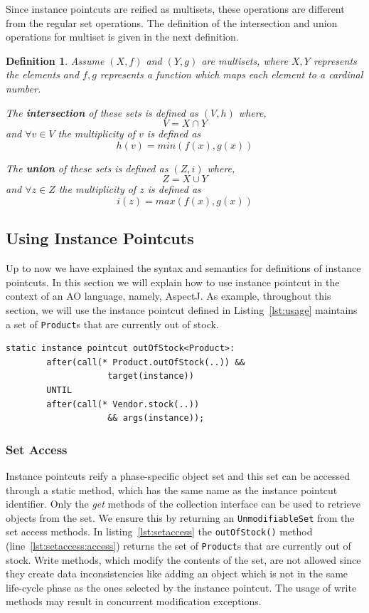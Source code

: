 \documentclass{acm_proc_article-sp}
\newtheorem{mydef}{Definition}
\newcommand{\lstinln}[1]{\lstinline~#1~}
\begin{document}
Since instance pointcuts are reified as multisets, these operations are different from the regular set operations. The definition of the intersection and union operations for multiset is given in the next definition.

\begin{mydef}
\label{def:inun}
Assume $(X, f)$ and $(Y, g)$ are multisets, where $X, Y$ represents the elements and $f, g$ represents a function which maps each element to a cardinal number. 

The \textbf{intersection} of these sets is defined as $(V, h)$ where, 
\[V = X \cap Y\] and
$\forall v \in V$ the multiplicity of $v$ is defined as \[h(v) =  min(f(x),g(x))\]

The \textbf{union} of these sets is defined as $(Z, i)$ where, 
\[Z = X \cup Y\] and
$\forall z \in Z$ the multiplicity of $z$ is defined as \[i(z) =  max(f(x),g(x))\]
\end{mydef}

\subsection{Using Instance Pointcuts}
Up to now we have explained the syntax and semantics for definitions of instance pointcuts. In this section we will explain how to use instance pointcut in the context of an AO language, namely, AspectJ. As example, throughout this section, we will use the instance pointcut defined in Listing~\ref{lst:usage} maintains a set of \lstinln{Product}s that are currently out of stock.

\begin{lstlisting}[float=h!, caption={An instance pointcut for out of stock products}, label={lst:usage}]
	static instance pointcut outOfStock<Product>: 
		after(call(* Product.outOfStock(..)) && 
					target(instance)) 
		UNTIL 
		after(call(* Vendor.stock(..)) 
					&& args(instance));
\end{lstlisting}

\subsubsection{Set Access}
Instance pointcuts reify a phase-specific object set and this set can be accessed through a static method, which has the same name as the instance pointcut identifier. Only the \emph{get} methods of the collection interface can be used to retrieve objects from the set. We ensure this by returning an \lstinln{UnmodifiableSet} from the set access methods. In listing~\ref{lst:setaccess} the \lstinln{outOfStock()} method (line~\ref{lst:setaccess:access}) returns the set of \lstinln{Product}s that are currently out of stock. Write methods, which modify the contents of the set, are not allowed since they create data inconsistencies like adding an object which is not in the same life-cycle phase as the ones selected by the instance pointcut. The usage of write methods may result in concurrent modification exceptions. 
\end{document}
